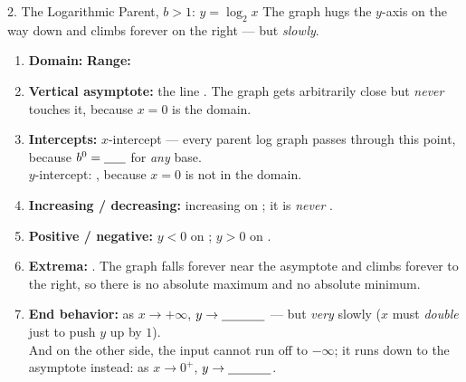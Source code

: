 \documentclass[10pt]{article}
\begin{document}
\begin{notesbox}{2. The Logarithmic Parent, $b>1$: $y=\log_2 x$}
\vspace{2pt}
The graph hugs the $y$-axis on the way down and climbs forever on the right --- but \emph{slowly}.
\begin{enumerate}[leftmargin=1.7em, itemsep=3pt]
  \item \textbf{Domain:} \blank{3.2cm} \quad \textbf{Range:} \blank{3.2cm}
  \item \textbf{Vertical asymptote:} the line \blank{1.6cm}. The graph gets arbitrarily close but
        \emph{never} touches it, because $x=0$ is \blank{3.6cm} the domain.
  \item \textbf{Intercepts:} $x$-intercept \blank{1.6cm} --- every parent log graph passes through
        this point, because $b^0=\blank{0.6cm}$ for \emph{any} base. \\
        $y$-intercept: \blank{2.0cm}, because $x=0$ is not in the domain.
  \item \textbf{Increasing / decreasing:} increasing on \blank{3.0cm}; it is \emph{never}
        \blank{2.4cm}.
  \item \textbf{Positive / negative:} $y<0$ on \blank{2.4cm}; \quad $y>0$ on \blank{2.4cm}.
  \item \textbf{Extrema:} \blank{2.0cm}. The graph falls forever near the asymptote and climbs
        forever to the right, so there is no absolute maximum and no absolute minimum.
  \item \textbf{End behavior:} as $x\to+\infty$, $y\to\blank{1.2cm}$ --- but \emph{very} slowly
        ($x$ must \emph{double} just to push $y$ up by $1$). \\
        And on the other side, the input cannot run off to $-\infty$; it runs down to the asymptote
        instead: as $x\to 0^{+}$, $y\to\blank{1.2cm}$.
\end{enumerate}
\end{notesbox}
\end{document}
